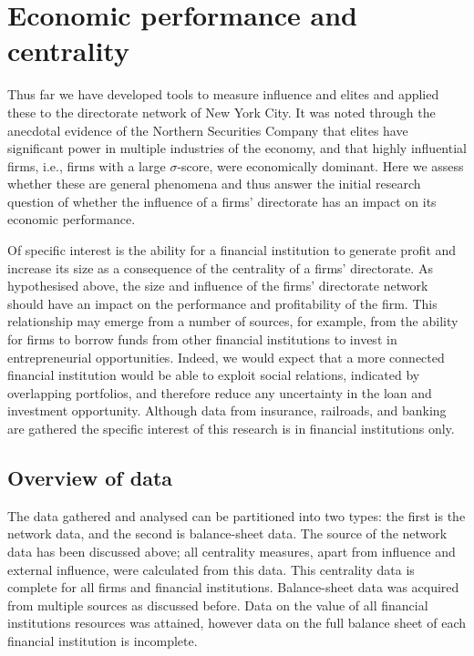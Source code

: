 \documentclass[11pt,fleqn]{article}
\begin{document}
\section{Economic performance and centrality} \label{Application:Regression}

Thus far we have developed tools to measure influence and elites and applied these to the directorate network of New York City. It was noted through the anecdotal evidence of the Northern Securities Company that elites have significant power in multiple industries of the economy, and that highly influential firms, i.e., firms with a large $\sigma$-score, were economically dominant. Here we assess whether these are general phenomena and thus answer the initial research question of whether the influence of a firms' directorate has an impact on its economic performance.

Of specific interest is the ability for a financial institution to generate profit and increase its size as a consequence of the centrality of a firms' directorate. As hypothesised above, the size and influence of the firms' directorate network should have an impact on the performance and profitability of the firm. This relationship may emerge from a number of sources, for example, from the ability for firms to borrow funds from other financial institutions to invest in entrepreneurial opportunities. Indeed, we would expect that a more connected financial institution would be able to exploit social relations, indicated by overlapping portfolios, and therefore reduce any uncertainty in the loan and investment opportunity. Although data from insurance, railroads, and banking are gathered the specific interest of this research is in financial institutions only.

\subsection{Overview of data}

The data gathered and analysed can be partitioned into two types: the first is the network data, and the second is balance-sheet data. The source of the network data has been discussed above; all centrality measures, apart from influence and external influence, were calculated from this data. This centrality data is complete for all firms and financial institutions. Balance-sheet data was acquired from multiple sources as discussed before. Data on the value of all financial institutions resources was attained, however data on the full balance sheet of each financial institution is incomplete.
\end{document}
